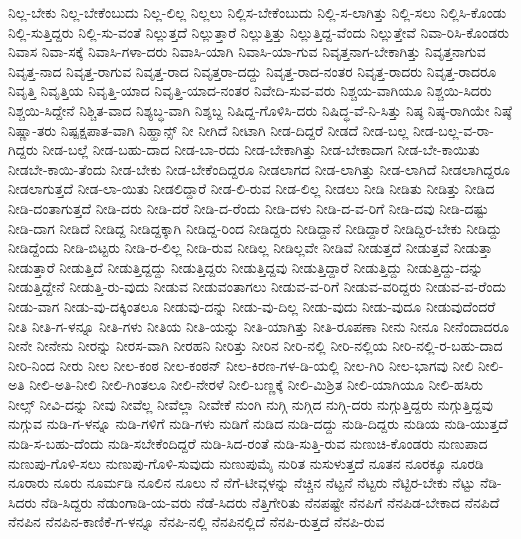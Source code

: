 {ನಿಲ್ಲ-ಬೇಕು
ನಿಲ್ಲ-ಬೇಕೆಂಬುದು
ನಿಲ್ಲ-ಲಿಲ್ಲ
ನಿಲ್ಲಲು
ನಿಲ್ಲಿಸ-ಬೇಕೆಂಬುದು
ನಿಲ್ಲಿ-ಸ-ಲಾಗಿತ್ತು
ನಿಲ್ಲಿ-ಸಲು
ನಿಲ್ಲಿಸಿ-ಕೊಂಡು
ನಿಲ್ಲಿ-ಸುತ್ತಿದ್ದರು
ನಿಲ್ಲಿ-ಸು-ವಂತೆ
ನಿಲ್ಲುತ್ತದೆ
ನಿಲ್ಲುತ್ತಾರೆ
ನಿಲ್ಲುತ್ತಿತ್ತು
ನಿಲ್ಲುತ್ತಿದ್ದ-ವೆಂದು
ನಿಲ್ಲುತ್ತೇವೆ
ನಿವಾ-ರಿಸಿ-ಕೊಂಡರು
ನಿವಾಸ
ನಿವಾ-ಸಕ್ಕೆ
ನಿವಾಸಿ-ಗಳಾ-ದರು
ನಿವಾಸಿ-ಯಾಗಿ
ನಿವಾಸಿ-ಯಾ-ಗುವ
ನಿವೃತ್ತನಾಗ-ಬೇಕಾಗಿತ್ತು
ನಿವೃತ್ತನಾಗುವ
ನಿವೃತ್ತ-ನಾದ
ನಿವೃತ್ತ-ರಾಗುವ
ನಿವೃತ್ತ-ರಾದ
ನಿವೃತ್ತರಾ-ದದ್ದು
ನಿವೃತ್ತ-ರಾದ-ನಂತರ
ನಿವೃತ್ತ-ರಾದರು
ನಿವೃತ್ತ-ರಾದರೂ
ನಿವೃತ್ತಿ
ನಿವೃತ್ತಿಯ
ನಿವೃತ್ತಿ-ಯಾದ
ನಿವೃತ್ತಿ-ಯಾದ-ನಂತರ
ನಿವೇದಿ-ಸುವ-ವರು
ನಿಶ್ಚಯ-ವಾಗಿಯೂ
ನಿಶ್ಚಯಿ-ಸಿದರು
ನಿಶ್ಚಯಿ-ಸಿದ್ದೇನೆ
ನಿಶ್ಚಿತ-ವಾದ
ನಿಶ್ಯಬ್ಧ-ವಾಗಿ
ನಿಶ್ಶಬ್ದ
ನಿಷಿದ್ದ-ಗೊಳಿಸಿ-ದರು
ನಿಷಿದ್ಧ-ವೆ-ನಿ-ಸಿತ್ತು
ನಿಷ್ಠ
ನಿಷ್ಠ-ರಾಗಿಯೇ
ನಿಷ್ಠೆ
ನಿಷ್ಣಾ-ತರು
ನಿಷ್ಪಕ್ಷಪಾತ-ವಾಗಿ
ನಿಹ್ಹಾನ್ಸ್
ನೀ
ನೀಗಿದೆ
ನೀಟಾಗಿ
ನೀಡ-ದಿದ್ದರೆ
ನೀಡದೆ
ನೀಡ-ಬಲ್ಲ
ನೀಡ-ಬಲ್ಲ-ವ-ರಾ-ಗಿದ್ದರು
ನೀಡ-ಬಲ್ಲೆ
ನೀಡ-ಬಹು-ದಾದ
ನೀಡ-ಬಾ-ರದು
ನೀಡ-ಬೇಕಾಗಿತ್ತು
ನೀಡ-ಬೇಕಾದಾಗ
ನೀಡ-ಬೇ-ಕಾಯಿತು
ನೀಡಬೇ-ಕಾಯಿ-ತೆಂದು
ನೀಡ-ಬೇಕು
ನೀಡ-ಬೇಕೆಂದಿದ್ದರೂ
ನೀಡಲಾಗದ
ನೀಡ-ಲಾಗಿತ್ತು
ನೀಡ-ಲಾಗಿದೆ
ನೀಡಲಾಗಿದ್ದರೂ
ನೀಡಲಾಗುತ್ತದೆ
ನೀಡ-ಲಾ-ಯಿತು
ನೀಡಲಿದ್ದಾರೆ
ನೀಡ-ಲಿ-ರುವ
ನೀಡ-ಲಿಲ್ಲ
ನೀಡಲು
ನೀಡಿ
ನೀಡಿತು
ನೀಡಿತ್ತು
ನೀಡಿದ
ನೀಡಿ-ದಂತಾಗುತ್ತದೆ
ನೀಡಿ-ದರು
ನೀಡಿ-ದರೆ
ನೀಡಿ-ದ-ರೆಂದು
ನೀಡಿ-ದಳು
ನೀಡಿ-ದ-ವ-ರಿಗೆ
ನೀಡಿ-ದವು
ನೀಡಿ-ದಷ್ಟು
ನೀಡಿ-ದಾಗ
ನೀಡಿದೆ
ನೀಡಿದ್ದ
ನೀಡಿದ್ದಕ್ಕಾಗಿ
ನೀಡಿದ್ದ-ರಿಂದ
ನೀಡಿದ್ದರು
ನೀಡಿದ್ದಾನೆ
ನೀಡಿದ್ದಾರೆ
ನೀಡಿದ್ದಿರ-ಬೇಕು
ನೀಡಿದ್ದು
ನೀಡಿದ್ದೆಂದು
ನೀಡಿ-ಬಿಟ್ಟರು
ನೀಡಿ-ರ-ಲಿಲ್ಲ
ನೀಡಿ-ರುವ
ನೀಡಿಲ್ಲ
ನೀಡಿಲ್ಲವೇ
ನೀಡಿವೆ
ನೀಡುತ್ತದೆ
ನೀಡುತ್ತವೆ
ನೀಡುತ್ತಾ
ನೀಡುತ್ತಾರೆ
ನೀಡುತ್ತಿದೆ
ನೀಡುತ್ತಿದ್ದದ್ದು
ನೀಡುತ್ತಿದ್ದರು
ನೀಡುತ್ತಿದ್ದವು
ನೀಡುತ್ತಿದ್ದಾರೆ
ನೀಡುತ್ತಿದ್ದು
ನೀಡುತ್ತಿದ್ದು-ದನ್ನು
ನೀಡುತ್ತಿದ್ದೇನೆ
ನೀಡುತ್ತಿ-ರು-ವುದು
ನೀಡುವ
ನೀಡುವಂತಾಗಲು
ನೀಡುವ-ವ-ರಿಗೆ
ನೀಡುವ-ವರಿದ್ದರು
ನೀಡುವ-ವ-ರೆಂದು
ನೀಡು-ವಾಗ
ನೀಡು-ವು-ದಕ್ಕಿಂತಲೂ
ನೀಡುವು-ದನ್ನು
ನೀಡು-ವು-ದಿಲ್ಲ
ನೀಡು-ವುದು
ನೀಡು-ವುದೂ
ನೀಡುವುದೆಂದರೆ
ನೀತಿ
ನೀತಿ-ಗ-ಳನ್ನೂ
ನೀತಿ-ಗಳು
ನೀತಿಯ
ನೀತಿ-ಯನ್ನು
ನೀತಿ-ಯಾಗಿತ್ತು
ನೀತಿ-ರೂಪಣಾ
ನೀನು
ನೀನೂ
ನೀನೆಂದಾದರೂ
ನೀನೇ
ನೀನೇನು
ನೀರನ್ನು
ನೀರಸ-ವಾಗಿ
ನೀರಹನಿ
ನೀರಿತ್ತು
ನೀರಿನ
ನೀರಿ-ನಲ್ಲಿ
ನೀರಿ-ನಲ್ಲಿಯ
ನೀರಿ-ನಲ್ಲಿ-ರ-ಬಹು-ದಾದ
ನೀರಿ-ನಿಂದ
ನೀರು
ನೀಲ
ನೀಲ-ಕಂಠ
ನೀಲ-ಕಂಠನ್
ನೀಲ-ಕಿರಣ-ಗಳ-ಡಿ-ಯಲ್ಲಿ
ನೀಲ-ಗಿರಿ
ನೀಲ-ಭಾಗವು
ನೀಲಿ
ನೀಲಿ-ಅತಿ
ನೀಲಿ-ಅತಿ-ನೀಲಿ
ನೀಲಿ-ಗಿಂತಲೂ
ನೀಲಿ-ನೇರಳೆ
ನೀಲಿ-ಬಣ್ಣಕ್ಕೆ
ನೀಲಿ-ಮಿಶ್ರಿತ
ನೀಲಿ-ಯಾಗಿಯೂ
ನೀಲಿ-ಹಸಿರು
ನೀಲ್ಸ್
ನೀವಿ-ದನ್ನು
ನೀವು
ನೀವೆಲ್ಲ
ನೀವೆಲ್ಲಾ
ನೀವೇಕೆ
ನುಂಗಿ
ನುಗ್ಗಿ
ನುಗ್ಗಿದ
ನುಗ್ಗಿ-ದರು
ನುಗ್ಗುತ್ತಿದ್ದರು
ನುಗ್ಗುತ್ತಿದ್ದವು
ನುಗ್ಗುವ
ನುಡಿ-ಗ-ಳನ್ನೂ
ನುಡಿ-ಗಳಿಗೆ
ನುಡಿ-ಗಳು
ನುಡಿಗೆ
ನುಡಿದ
ನುಡಿ-ದದ್ದು
ನುಡಿ-ದಿದ್ದರು
ನುಡಿಯ
ನುಡಿ-ಯುತ್ತದೆ
ನುಡಿ-ಸ-ಬಹು-ದೆಂದು
ನುಡಿ-ಸಬೇಕೆಂದಿದ್ದರೆ
ನುಡಿ-ಸಿದ-ರಂತೆ
ನುಡಿ-ಸುತ್ತಿ-ರುವ
ನುಣುಚಿ-ಕೊಂಡರು
ನುಣುಪಾದ
ನುಣುಪು-ಗೊಳಿ-ಸಲು
ನುಣುಪು-ಗೊಳಿ-ಸುವುದು
ನುಣುಪುಮೈ
ನುರಿತ
ನುಸುಳುತ್ತದೆ
ನೂತನ
ನೂರಕ್ಕೂ
ನೂರಡಿ
ನೂರಾರು
ನೂರು
ನೂರ್ಮಡಿ
ನೂಲಿನ
ನೂಲು
ನೆ
ನೆಗೆ-ಟೀವ್ಗಳನ್ನು
ನೆಚ್ಚಿನ
ನೆಟ್ಟನೆ
ನೆಟ್ಟರು
ನೆಟ್ಟಿರ-ಬೇಕು
ನೆಟ್ಟು
ನೆಡಿ-ಸಿದರು
ನೆಡಿ-ಸಿದ್ದರು
ನೆಡುಂಗಾಡಿ-ಯ-ವರು
ನೆಡೆ-ಸಿದರು
ನೆತ್ತಿಗೇರಿತು
ನೆನಪಷ್ಟೇ
ನೆನಪಿಗೆ
ನೆನಪಿಡ-ಬೇಕಾದ
ನೆನಪಿದೆ
ನೆನಪಿನ
ನೆನಪಿನ-ಕಾಣಿಕೆ-ಗ-ಳನ್ನೂ
ನೆನಪಿ-ನಲ್ಲಿ
ನೆನಪಿನಲ್ಲಿದೆ
ನೆನಪಿ-ರುತ್ತದೆ
ನೆನಪಿ-ರುವ
}
